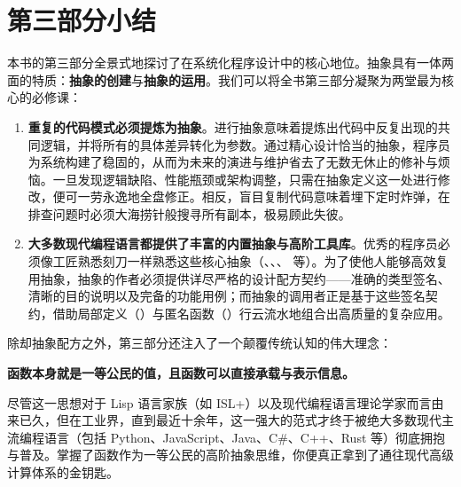 \chapter{第三部分小结}
\label{sec:ch18_summary}

本书的第三部分全景式地探讨了在系统化程序设计中的核心地位。抽象具有一体两面的特质：\textbf{抽象的创建}与\textbf{抽象的运用}。我们可以将全书第三部分凝聚为两堂最为核心的必修课：

\begin{enumerate}
  \item \textbf{重复的代码模式必须提炼为抽象}。进行抽象意味着提炼出代码中反复出现的共同逻辑，并将所有的具体差异转化为参数。通过精心设计恰当的抽象，程序员为系统构建了稳固的，从而为未来的演进与维护省去了无数无休止的修补与烦恼。一旦发现逻辑缺陷、性能瓶颈或架构调整，只需在抽象定义这一处进行修改，便可一劳永逸地全盘修正。相反，盲目复制代码意味着埋下定时炸弹，在排查问题时必须大海捞针般搜寻所有副本，极易顾此失彼。
  \item \textbf{大多数现代编程语言都提供了丰富的内置抽象与高阶工具库}。优秀的程序员必须像工匠熟悉刻刀一样熟悉这些核心抽象（、、、 等）。为了使他人能够高效复用抽象，抽象的作者必须提供详尽严格的设计配方契约——准确的类型签名、清晰的目的说明以及完备的功能用例；而抽象的调用者正是基于这些签名契约，借助局部定义（）与匿名函数（）行云流水地组合出高质量的复杂应用。
\end{enumerate}

除却抽象配方之外，第三部分还注入了一个颠覆传统认知的伟大理念：
\begin{center}
  \textbf{\large\color{NavyTheme}函数本身就是一等公民的值，且函数可以直接承载与表示信息。}
\end{center}

尽管这一思想对于 Lisp 语言家族（如 ISL+）以及现代编程语言理论学家而言由来已久，但在工业界，直到最近十余年，这一强大的范式才终于被绝大多数现代主流编程语言（包括 Python、JavaScript、Java、C\#、C++、Rust 等）彻底拥抱与普及。掌握了函数作为一等公民的高阶抽象思维，你便真正拿到了通往现代高级计算体系的金钥匙。
